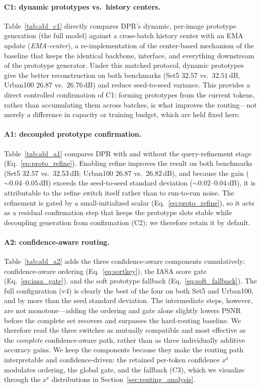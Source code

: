 \paragraph{C1: dynamic prototypes vs.\ history centers.}
Table~\ref{tab:abl_c1} directly compares DPR's dynamic, per-image prototype generation
(the full model) against a cross-batch history center with an EMA update
(\emph{EMA-center}), a re-implementation of the center-based mechanism of the baseline that
keeps the identical backbone, interface, and everything downstream of the prototype
generator. Under this matched protocol, dynamic prototypes give the better
reconstruction on both benchmarks (Set5 $32.57$ vs.\ $32.51$\,dB, Urban100 $26.87$ vs.\
$26.76$\,dB) and reduce seed-to-seed variance. This provides a direct controlled
confirmation of C1: forming prototypes from the current tokens, rather than accumulating them
across batches, is what improves the routing---not merely a difference in capacity or
training budget, which are held fixed here.

\paragraph{A1: decoupled prototype confirmation.}
Table~\ref{tab:abl_a1} compares DPR with and without the query-refinement stage
(Eq.~\eqref{eq:proto_refine}). Enabling refine improves the result on both benchmarks
(Set5 $32.57$ vs.\ $32.53$\,dB; Urban100 $26.87$ vs.\ $26.82$\,dB), and because the gain
($\sim0.04$--$0.05$\,dB) exceeds the seed-to-seed standard deviation ($\sim0.02$--$0.04$\,dB),
it is attributable to the refine switch itself rather than to run-to-run noise. The refinement
is gated by a small-initialized scalar (Eq.~\eqref{eq:proto_refine}), so it acts as a residual
confirmation step that keeps the prototype slots stable while decoupling generation from
confirmation (C2); we therefore retain it by default.

\paragraph{A2: confidence-aware routing.}
Table~\ref{tab:abl_a2} adds the three confidence-aware components cumulatively:
confidence-aware ordering (Eq.~\eqref{eq:sortkey}), the IASA score gate
(Eq.~\eqref{eq:iasa_gate}), and the soft prototype fallback
(Eq.~\eqref{eq:soft_fallback}). The full configuration (v4) is clearly the best of the four on
both Set5 and Urban100, and by more than the seed standard deviation. The intermediate steps,
however, are not monotone---adding the ordering and gate alone slightly lowers PSNR before the
complete set recovers and surpasses the hard-routing baseline. We therefore read the three
switches as mutually compatible and most effective as the \emph{complete} confidence-aware
path, rather than as three individually additive accuracy gains. We keep the components
because they make the routing path interpretable and confidence-driven: the retained per-token
confidence $x^{\mathrm{s}}$ modulates ordering, the global gate, and the fallback (C3), which
we visualize through the $x^{\mathrm{s}}$ distributions in Section~\ref{sec:routing_analysis}.

